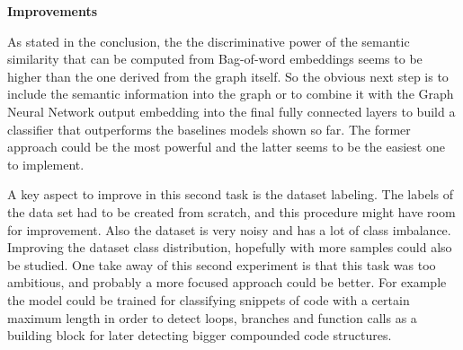 




\textbf{Improvements}

As stated in the conclusion, the the discriminative power of the semantic similarity that can be computed from Bag-of-word embeddings seems to be higher than the one derived from the graph itself. So the obvious next step is to include the semantic information into the graph or to combine it with the Graph Neural Network output embedding into the final fully connected layers to build a classifier that outperforms the baselines models shown so far. The former approach could be the most powerful and the latter seems to be the easiest one to implement.

A key aspect to improve in this second task is the dataset labeling. The labels of the data set had to be created from scratch, and this procedure might have room for improvement. Also the dataset is very noisy and has a lot of class imbalance. Improving the dataset class distribution, hopefully with more samples could also be studied. One take away of this second experiment is that this task was too ambitious, and probably a more focused approach could be better. For example the model could be trained for classifying snippets of code with a certain maximum length in order to detect loops, branches and function calls as a building block for later detecting bigger compounded code structures.